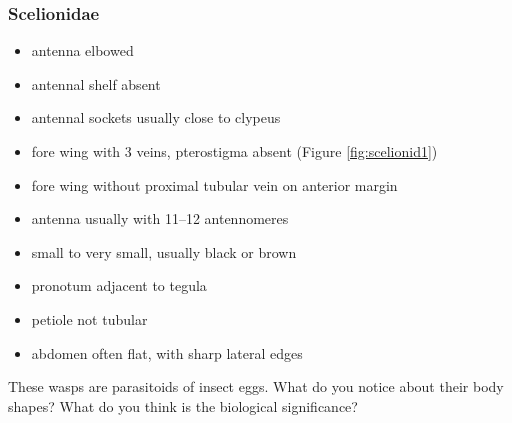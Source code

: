 \documentclass[letterpaper, 11pt]{article}
\begin{document}
\subsubsection{Scelionidae}
\begin{itemize}
\item antenna elbowed
\item antennal shelf absent
\item antennal sockets usually close to clypeus
\item fore wing with 3 veins, pterostigma absent (Figure \ref{fig:scelionid1})
\item fore wing without proximal tubular vein on anterior margin
\item antenna usually with 11--12 antennomeres
\item small to very small, usually black or brown
\item pronotum adjacent to tegula
\item petiole not tubular
\item abdomen often flat, with sharp lateral edges
\end{itemize}
\noindent{}These wasps are parasitoids of insect eggs. What do you notice about their body shapes? What do you think is the biological significance?\\
\end{document}
